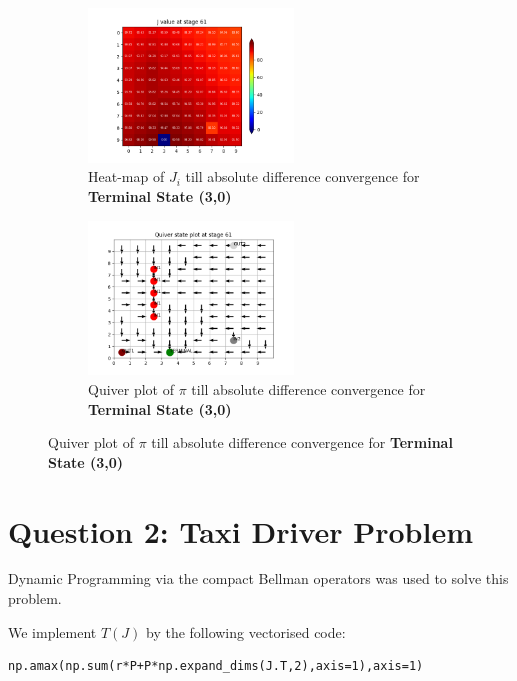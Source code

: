 \begin{figure}[h]
\begin{subfigure}
\centering
\includegraphics[angle=0,width=0.6\textwidth]{hw2/logs/t=3_N=-1/J-heatmap-61.png}
\caption{Heat-map of $J_i$ till absolute difference convergence for \textbf{Terminal State (3,0)}}
\end{subfigure}

\begin{subfigure}
\centering
\includegraphics[angle=0,width=0.6\textwidth]{hw2/logs/t=3_N=-1/quiver-61.png}
\caption{Quiver plot of $\pi$  till absolute difference convergence for \textbf{Terminal State (3,0)}}
\end{subfigure}
\end{figure}

\section {Question 2: Taxi Driver Problem}

Dynamic Programming via the compact Bellman operators was used to solve this problem.

We implement $T(J)$ by the following vectorised code:
\begin{lstlisting}[numbers = none]
np.amax(np.sum(r*P+P*np.expand_dims(J.T,2),axis=1),axis=1)
\end{lstlisting}

